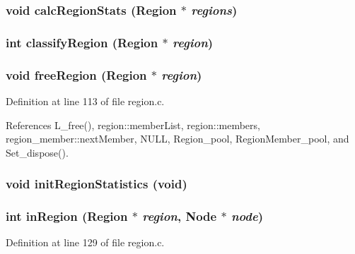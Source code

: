\subsubsection{\setlength{\rightskip}{0pt plus 5cm}void calc\-Region\-Stats (\bf{Region} $\ast$ {\em regions})}\label{region_8h_5600d2c58eda6e8a4f112d51c9cd8014}


\subsubsection{\setlength{\rightskip}{0pt plus 5cm}int classify\-Region (\bf{Region} $\ast$ {\em region})}\label{region_8h_100dd2b577e24a435306cb3653cc11f0}


\subsubsection{\setlength{\rightskip}{0pt plus 5cm}void free\-Region (\bf{Region} $\ast$ {\em region})}\label{region_8h_b24dd54edc0ca358ddef994d6d2a4bbc}




Definition at line 113 of file region.c.

References L\_\-free(), region::member\-List, region::members, region\_\-member::next\-Member, NULL, Region\_\-pool, Region\-Member\_\-pool, and Set\_\-dispose().
\subsubsection{\setlength{\rightskip}{0pt plus 5cm}void init\-Region\-Statistics (void)}\label{region_8h_c50ad58fc88167334f600c6cbc25ddfe}


\subsubsection{\setlength{\rightskip}{0pt plus 5cm}int in\-Region (\bf{Region} $\ast$ {\em region}, \bf{Node} $\ast$ {\em node})}\label{region_8h_34d3995284a72df5bda745011f4c5430}




Definition at line 129 of file region.c.

